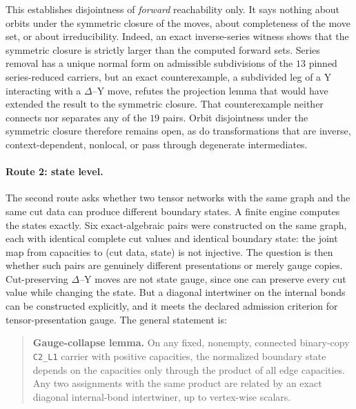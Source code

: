 This establishes disjointness of \emph{forward} reachability only. It says nothing about orbits under the symmetric
closure of the moves, about completeness of the move set, or about irreducibility. Indeed, an exact inverse-series
witness shows that the symmetric closure is strictly larger than the computed forward sets. Series removal has a unique
normal form on admissible subdivisions of the \(13\) pinned series-reduced carriers, but an exact counterexample, a
subdivided leg of a Y interacting with a \(\Delta\)--Y move, refutes the projection lemma that would have extended the
result to the symmetric closure. That counterexample neither connects nor separates any of the \(19\) pairs. Orbit
disjointness under the symmetric closure therefore remains open, as do transformations that are inverse,
context-dependent, nonlocal, or pass through degenerate intermediates.

\paragraph{Route 2: state level.} The second route asks whether two tensor networks with the same graph and the same
cut data can produce different boundary states. A finite engine computes the states exactly. Six exact-algebraic pairs
were constructed on the same graph, each with identical complete cut values and identical boundary state: the joint
map from capacities to (cut data, state) is not injective. The question is then whether such pairs are genuinely
different presentations or merely gauge copies. Cut-preserving \(\Delta\)--Y moves are not state gauge, since one can
preserve every cut value while changing the state. But a diagonal intertwiner on the internal bonds can be constructed
explicitly, and it meets the declared admission criterion for tensor-presentation gauge. The general statement is:

\begin{quote}
\textbf{Gauge-collapse lemma.} On any fixed, nonempty, connected binary-copy \texttt{C2\_L1} carrier with positive
capacities, the normalized boundary state depends on the capacities only through the product of all edge capacities.
Any two assignments with the same product are related by an exact diagonal internal-bond intertwiner, up to
vertex-wise scalars.
\end{quote}

